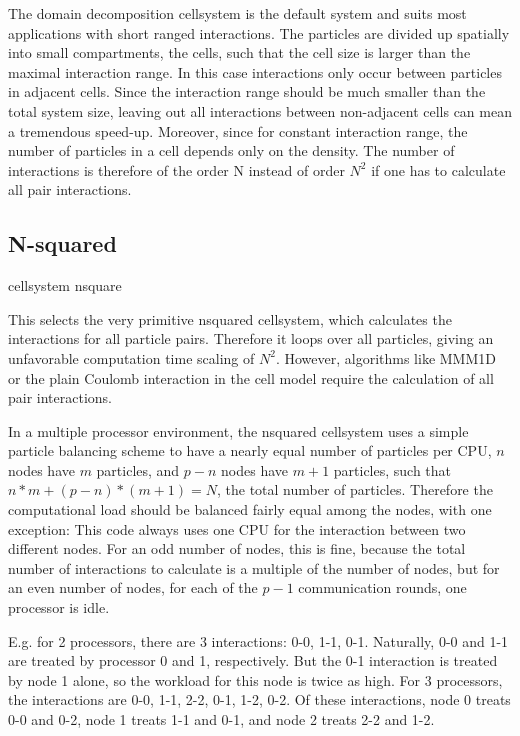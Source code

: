 The domain decomposition cellsystem is the default system and suits
most applications with short ranged interactions. The particles are
divided up spatially into small compartments, the cells, such that the
cell size is larger than the maximal interaction range. In this case
interactions only occur between particles in adjacent cells. Since the
interaction range should be much smaller than the total system size,
leaving out all interactions between non-adjacent cells can mean a
tremendous speed-up. Moreover, since for constant interaction range,
the number of particles in a cell depends only on the density. The
number of interactions is therefore of the order N instead of order
$N^2$ if one has to calculate all pair interactions.

\subsection{N-squared}
\begin{essyntax}
  cellsystem nsquare 
\end{essyntax}
This selects the very primitive nsquared cellsystem, which calculates
the interactions for all particle pairs. Therefore it loops over all
particles, giving an unfavorable computation time scaling of $N^2$.
However, algorithms like MMM1D or the plain Coulomb interaction in the
cell model require the calculation of all pair interactions.

In a multiple processor environment, the nsquared cellsystem uses a
simple particle balancing scheme to have a nearly equal number of
particles per CPU, \ie $n$ nodes have $m$ particles, and $p-n$ nodes
have $m+1$ particles, such that $n*m+(p-n)*(m+1)=N$, the total number
of particles. Therefore the computational load should be balanced
fairly equal among the nodes, with one exception: This code always
uses one CPU for the interaction between two different nodes. For an
odd number of nodes, this is fine, because the total number of
interactions to calculate is a multiple of the number of nodes, but
for an even number of nodes, for each of the $p-1$ communication
rounds, one processor is idle.

E.g. for 2 processors, there are 3 interactions: 0-0, 1-1, 0-1.
Naturally, 0-0 and 1-1 are treated by processor 0 and 1, respectively.
But the 0-1 interaction is treated by node 1 alone, so the workload
for this node is twice as high. For 3 processors, the interactions are
0-0, 1-1, 2-2, 0-1, 1-2, 0-2. Of these interactions, node 0 treats 0-0
and 0-2, node 1 treats 1-1 and 0-1, and node 2 treats 2-2 and 1-2.

